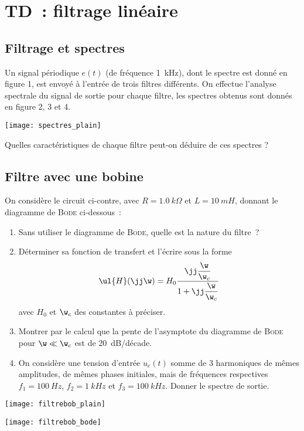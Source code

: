 \documentclass[a4paper, 12pt, final, garamond]{book}
\begin{document}
\setcounter{chapter}{6}

\chapter{TD~: filtrage lin\'eaire}

\section{Filtrage et spectres}

Un signal périodique $e(t)$ (de fréquence \SI{1}{kHz}), dont le spectre est
donné en figure 1, est envoyé à l'entrée de trois filtres différents. On
effectue l'analyse spectrale du signal de sortie pour chaque filtre, les
spectres obtenus sont donnés en figure 2, 3 et 4.

\begin{center}
    \texttt{[image: spectres\_plain]}
\end{center}

Quelles caractéristiques de chaque filtre peut-on déduire de ces spectres ?

\section{Filtre avec une bobine}
On considère le circuit ci-contre, avec $R = \SI{1.0}{k\Omega}$ et $L =
\SI{10}{mH}$, donnant le diagramme de \textsc{Bode} ci-dessous~:

\begin{minipage}{0.60\linewidth}
    \begin{enumerate}
        \item Sans utiliser le diagramme de \textsc{Bode}, quelle est la nature
            du filtre~?
        \item Déterminer sa fonction de transfert et l'écrire sous la forme
            \[\ul{H}(\jj\w) = H_0 \frac{\jj\dfrac{\w}{\w_c}}{1 +
            \jj\dfrac{\w}{\w_c}}\]
            avec $H_0$ et $\w_c$ des constantes à préciser.
        \item Montrer par le calcul que la pente de l'asymptote du diagramme
            de \textsc{Bode} pour $\w \ll \w_c$ est de \SI{20}{dB/décade}.
        \item On considère une tension d'entrée $u_e(t)$ somme de 3 harmoniques de
            mêmes amplitudes, de mêmes phases initiales, mais de fréquences
            respectives $f_1 = \SI{100}{Hz}$, $f_2 = \SI{1}{kHz}$ et $f_3 =
            \SI{100}{kHz}$. Donner le spectre de sortie.
    \end{enumerate}
\end{minipage}
\hfill
\begin{minipage}{0.35\linewidth}
    \begin{center}
        \hspace{10pt}\texttt{[image: filtrebob\_plain]}
    \end{center}
    \begin{center}
        \texttt{[image: filtrebob\_bode]}
    \end{center}
\end{minipage}
\end{document}
